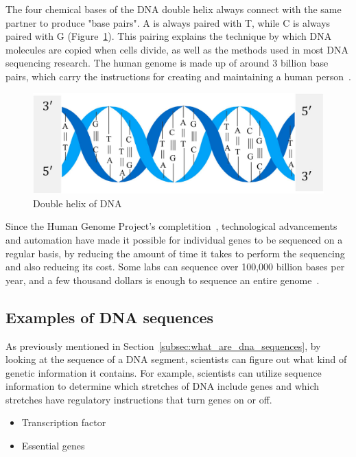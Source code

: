 The four chemical bases of the DNA double helix always connect with the same partner to produce "base pairs". \gls{A} is always paired with \gls{T}, while \gls{C} is always paired with \gls{G} (Figure~\ref{fig:dna}). This pairing explains the technique by which DNA molecules are copied when cells divide, as well as the methods used in most DNA sequencing research. The human \gls{genome} is made up of around 3 billion base pairs, which carry the instructions for creating and maintaining a human person~\cite{2020DNASheet}.

\begin{figure}[htbp]
    \centering
    \includegraphics[width=0.5\linewidth]{Chapters/Figures/dna.jpg}
    \caption{Double helix of DNA~\cite{Yang2020ReviewDNA}}
    \label{fig:dna}
\end{figure}

Since the Human Genome Project's completition~\cite{TheProject}, technological advancements and automation have made it possible for individual genes to be sequenced on a regular basis, by reducing the amount of time it takes to perform the sequencing and also reducing its cost. Some labs can sequence over 100,000 billion bases per year, and a few thousand dollars is enough to sequence an entire \gls{genome}~\cite{2020DNASheet}. 

\subsection{Examples of DNA sequences}

As previously mentioned in Section~\ref{subsec:what_are_dna_sequences}, by looking at the sequence of a DNA segment, scientists can figure out what kind of genetic information it contains. For example, scientists can utilize sequence information to determine which stretches of DNA include genes and which stretches have regulatory instructions that turn genes on or off.



\begin{itemize}
    \item Transcription factor
    \item Essential genes
\end{itemize}

